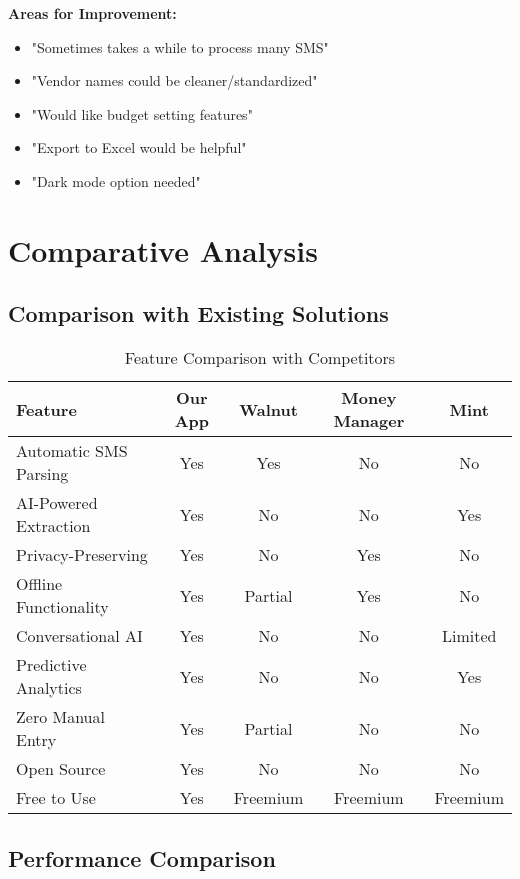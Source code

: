 \documentclass[11pt,a4paper]{report}
\begin{document}
\textbf{Areas for Improvement:}
\begin{itemize}
    \item "Sometimes takes a while to process many SMS"
    \item "Vendor names could be cleaner/standardized"
    \item "Would like budget setting features"
    \item "Export to Excel would be helpful"
    \item "Dark mode option needed"
\end{itemize}

\section{Comparative Analysis}

\subsection{Comparison with Existing Solutions}

\begin{table}[H]
\centering
\caption{Feature Comparison with Competitors}
\begin{tabularx}{\textwidth}{|X|c|c|c|c|}
\hline
\textbf{Feature} & \textbf{Our App} & \textbf{Walnut} & \textbf{Money Manager} & \textbf{Mint} \\
\hline
Automatic SMS Parsing & Yes & Yes & No & No \\
AI-Powered Extraction & Yes & No & No & Yes \\
Privacy-Preserving & Yes & No & Yes & No \\
Offline Functionality & Yes & Partial & Yes & No \\
Conversational AI & Yes & No & No & Limited \\
Predictive Analytics & Yes & No & No & Yes \\
Zero Manual Entry & Yes & Partial & No & No \\
Open Source & Yes & No & No & No \\
Free to Use & Yes & Freemium & Freemium & Freemium \\
\hline
\end{tabularx}
\end{table}

\subsection{Performance Comparison}
\end{document}
